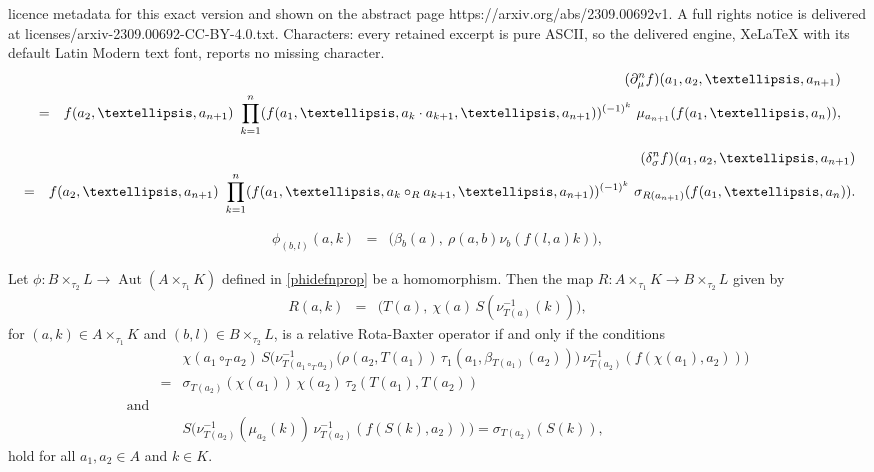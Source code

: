 \documentclass[10pt,a4paper]{amsart}
\newcommand{\Aut}{\operatorname{Aut} }
\begin{document}
licence metadata for this exact version and shown on the abstract page https://arxiv.org/abs/2309.00692v1. A full rights notice is delivered at licenses/arxiv-2309.00692-CC-BY-4.0.txt. Characters: every retained excerpt is pure ASCII, so the delivered engine, XeLaTeX with its default Latin Modern text font, reports no missing character.
\begin{eqnarray}\label{group coboundary mu}
&& (\partial_\mu^n f)(a_1, a_2,\ldots, a_{n+1}) \\
&= & f(a_2, \ldots,a_{n+1})~ \prod^{n}_{k=1}    (f(a_1, \ldots, a_k \cdot a_{k+1}, \ldots, a_{n+1}))^{(-1)^k}~ \mu_{a_{n+1}}(f(a_1, \ldots,a_{n})), \notag
\end{eqnarray} 

\begin{eqnarray}\label{group coboundary twisted sigma}
&&	(\delta_{\sigma}^n f)(a_1, a_2,\ldots, a_{n+1})\\
 &= & f(a_2, \ldots,a_{n+1}) ~\prod^{n}_{k=1}    (f(a_1, \ldots, a_k \circ_R a_{k+1}, \ldots, a_{n+1}))^{(-1)^k} ~ \sigma_{R(a_{n+1})}(f(a_1, \ldots,a_{n})). \notag
\end{eqnarray}

		\begin{eqnarray}\label{phidefnprop}
			\phi_{(b,l)}(a,k) &= & \big(\beta{_{b}(a)}, ~\rho(a,b)\nu_b(f(l,a)k)\big),
		\end{eqnarray} 

\begin{prop}\label{Rallcondn}
Let $\phi: B \times_{\tau_2} L \longrightarrow \Aut(A \times_{\tau_1} K )$ defined in \eqref{phidefnprop} be a homomorphism. Then the map  $R:  A \times_{\tau_1} K \rightarrow B \times_{\tau_2} L$ given by
\begin{eqnarray*}
R(a,k) &= & \big(T(a), ~\chi(a) \,S(\nu^{-1}_{T(a)}(k))\big),
\end{eqnarray*} 
for $(a,k) \in A \times_{\tau_1} K$ and $(b,l) \in B \times_{\tau_2} L$, is a relative Rota-Baxter operator if and only if the conditions 
\begin{eqnarray*}
& & \chi(a_1 \circ_{T} a_2) \,S \big(\nu^{-1}_{T(a_1 \circ_{T} a_2)}\big(\rho(a_2, T(a_1)) \,\tau_1(a_1,\beta{_{T(a_1)}}(a_2))\big) \,\nu^{-1}_{T(a_2)}(f(\chi(a_1), a_2))\big) \\
& =&   \sigma_{T(a_2)}( \chi(a_1)) \, \chi(a_2) \,\tau_2(T(a_1), T(a_2) )\\
\textrm{and} &&\\
&& S\big(\nu^{-1}_{T(a_2)}(\mu_{a_2}(k)) \,\nu^{-1}_{T( a_2)}(f(S(k), a_2))\big) = \sigma_{T(a_2)}(S(k)),	
\end{eqnarray*}		
hold for all $ a_1, a_2 \in A$ and $ k \in K$.
\end{prop}
\end{document}
